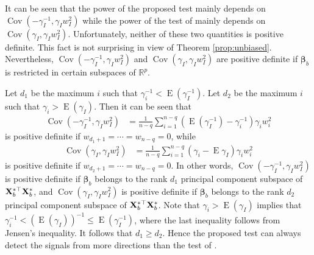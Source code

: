 \documentclass[smallextended]{svjour3}       %
\DeclareMathOperator{\myE}{E}
\DeclareMathOperator{\myCov}{Cov}
\newcommand{\bfsym}[1]{\ensuremath{\boldsymbol{#1}}}
\def\bbeta{\bfsym \beta}
\begin{document}
It can be seen %
that the power of the proposed test mainly depends on $\myCov (-\gamma_I^{-1}, \gamma_I w_I^2)$ while the power of the test of \cite{Goeman2006} mainly depends on $\myCov(\gamma_I, \gamma_I w_I^2)$.  
Unfortunately, neither of these two quantities is positive definite.
This fact is not surprising in view of Theorem \ref{prop:unbiased}.
Nevertheless, $\myCov (-\gamma_I^{-1}, \gamma_I w_I^2)$ and $\myCov(\gamma_I, \gamma_I w_I^2)$ are positive definite if $\bbeta_b$ is restricted  in certain subspaces of $\mathbb R^p$.

Let $d_1$ be the maximum $i$ such that $ \gamma_i^{-1} < \myE (\gamma_I^{-1})$.
Let $d_2$ be the maximum $i$ such that $\gamma_i > \myE (\gamma_I) $.
Then it can be seen that
\begin{align*}
\myCov (-\gamma_I^{-1}, \gamma_I w_I^2)
&=
\frac{1}{n-q} \sum_{i=1}^{n-q} \left(\myE (\gamma_I^{-1})-\gamma_i^{-1} \right) \gamma_i w_i^2
\end{align*}
is positive definite if $w_{d_1+1}=\cdots =w_{n-q}=0$, while
\begin{align*}
    \myCov(\gamma_I, \gamma_I w_I^2)
&=
\frac{1}{n-q} \sum_{i=1}^{n-q} \left(\gamma_i - \myE \gamma_I \right) \gamma_i w_i^2
\end{align*}
is positive definite if $w_{d_2 + 1}=\cdots = w_{n-q}=0$.
In other words, $\myCov(-\gamma_I^{-1}, \gamma_I w_I^2)$ is positive definite if $\bbeta_b$ belongs to the rank $d_1$ principal component subspace of $\mathbf{X}_{b}^{*\top}\mathbf{X}_b^{*}$, and $\myCov(\gamma_I, \gamma_I w_I^2)$ is positive definite if $\bbeta_b$ belongs to the rank $d_2$ principal component subspace of $\mathbf{X}_{b}^{*\top}\mathbf{X}_b^{*}$.
Note that $\gamma_i > \myE (\gamma_I)$ implies that $\gamma_i^{-1} < (\myE (\gamma_I))^{-1}\leq \myE (\gamma_I^{-1})$, where the last inequality follows from Jensen's inequality.
It follows that $ d_1 \geq d_2 $.
Hence the proposed test can always detect the signals from more directions than the test of \cite{Goeman2006}.
\end{document}
